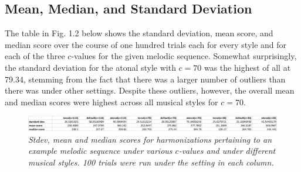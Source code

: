 \documentclass[twoside]{article}
\begin{document}
	\subsection{Mean, Median, and Standard Deviation}
	The table in Fig. 1.2 below shows the standard deviation, mean score, and median score over the course of one hundred trials each for every style and for each of the three $c$-values for the given melodic sequence. Somewhat surprisingly, the standard deviation for the atonal style with $c=70$ was the highest of all at 79.34, stemming from the fact that there was a larger number of outliers than there was under other settings. Despite these outliers, however, the overall mean and median scores were highest across all musical styles for $c=70$.
	\begin{figure}[h]  %
		\begin{center}  
			\includegraphics[scale=0.6]{Fig1_2.png}  
			\caption{\small \sl Stdev, mean and median scores for harmonizations pertaining to an example melodic sequence under various $c$-values and under different musical styles. 100 trials were run under the setting in each column.}
		\end{center}  
	\end{figure}
\end{document}
